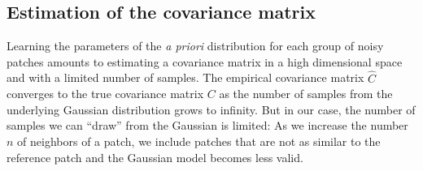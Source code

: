 \documentclass[10pt, a4paper]{article}
\newcommand{\pcomment}[1]{}
\newcommand{\ma}[1]{\boldsymbol{#1}}
\begin{document}







\subsection{Estimation of the covariance matrix}
\label{sse:covariance-estimation}


Learning the parameters of the \emph{a priori} distribution for each group of
noisy patches amounts to estimating a covariance matrix in a high dimensional space 
and with a limited number of samples. 
%
The empirical covariance matrix $\widehat C$ converges to the true covariance matrix
$C$ as the number of samples from the underlying Gaussian distribution grows to infinity.
But in our case, the number of samples we can ``draw'' from the Gaussian is limited:
As we increase the number $n$ of neighbors of a patch, we include patches
that are not as similar to the reference patch and the Gaussian model becomes less valid. 
\end{document}
